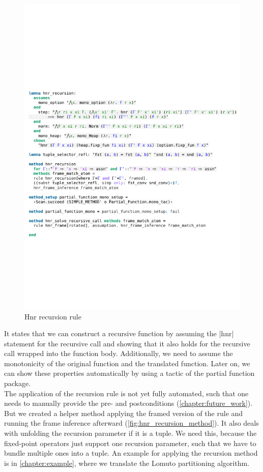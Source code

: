\begin{figure}[htpb]
    \includegraphics[trim={0 15,6cm 0 8,5cm}, clip, width=1.00\textwidth]{figures/Theory_Hnr_Recursion.pdf}
    \caption[Hnr recursion rule]{Hnr recursion rule}
    \label{fig:hnr_recursion}
\end{figure}

\noindent It states that we can construct a recursive function by assuming the |hnr| statement for the recursive call and showing that it also holds for the recursive call wrapped into the function body. Additionally, we need to assume the monotonicity of the original function and the translated function. Later on, we can show these properties automatically by using a tactic of the partial function package.\\
The application of the recursion rule is not yet fully automated, such that one needs to manually provide the pre- and postconditions (\autoref{chapter:future_work}). But we created a helper method applying the framed version of the rule and running the frame inference afterward (\autoref{fig:hnr_recursion_method}). It also deals with unfolding the recursion parameter if it is a tuple. We need this, because the fixed-point operators just support one recursion parameter, such that we have to bundle multiple ones into a tuple. An example for applying the recursion method is in \autoref{chapter:example}, where we translate the Lomuto partitioning algorithm.

